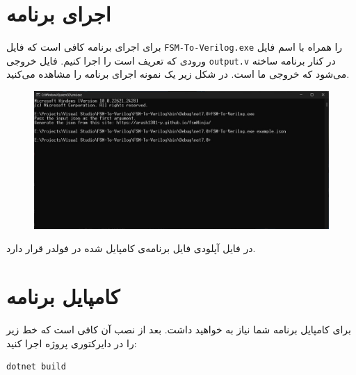 \documentclass[]{article}
\begin{document}
\section*{اجرای برنامه}
برای اجرای برنامه کافی است که فایل
\verb|FSM-To-Verilog.exe|
را همراه با اسم فایل ورودی
که تعریف
است را اجرا کنیم. فایل خروجی
\verb|output.v|
در کنار برنامه ساخته می‌شود که خروجی ما است.
در شکل زیر یک نمونه اجرای برنامه را مشاهده می‌کنید.
\begin{figure}[ht]
    \centering
    \includegraphics[scale=0.4]{pics/run.jpg}
\end{figure}
در فایل آپلودی فایل برنامه‌ی کامپایل شده در فولدر
قرار دارد.

\section*{کامپایل برنامه}
برای کامپایل برنامه شما نیاز به
خواهید داشت. بعد از نصب آن کافی است که خط زیر را در دایرکتوری پروژه اجرا کنید:
\begin{latin}
\begin{lstlisting}[language=verilog]
dotnet build
\end{lstlisting}
\end{latin}
\end{document}
